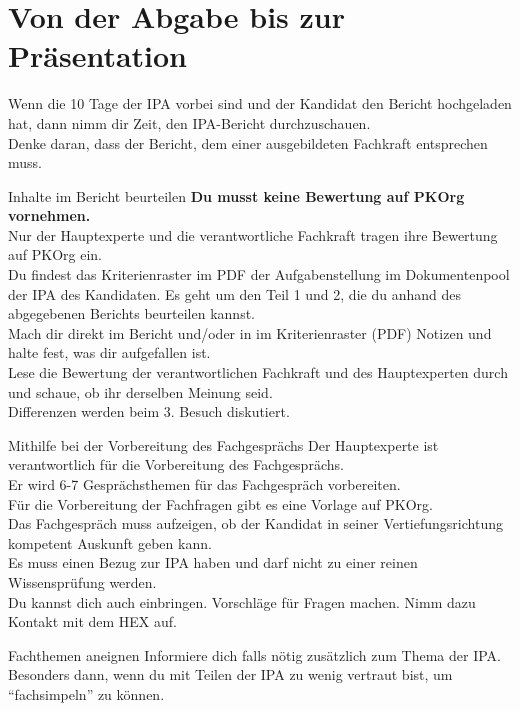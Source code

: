 \section{Von der Abgabe bis zur Präsentation}
Wenn die 10 Tage der IPA vorbei sind und der Kandidat den Bericht hochgeladen hat, dann nimm dir Zeit, den IPA-Bericht durchzuschauen.\\
Denke daran, dass der Bericht, dem einer ausgebildeten Fachkraft entsprechen muss.

\begin{taskitemwithoutcomment}{Inhalte im Bericht beurteilen}
  \textbf{Du musst keine Bewertung auf PKOrg vornehmen.}\\
  Nur der Hauptexperte und die verantwortliche Fachkraft tragen ihre Bewertung auf PKOrg ein.\\
  Du findest das Kriterienraster im PDF der Aufgabenstellung im Dokumentenpool der IPA des Kandidaten.
  Es geht um den Teil 1 und 2, die du anhand des abgegebenen Berichts beurteilen kannst.\\
  Mach dir direkt im Bericht und/oder in im Kriterienraster (PDF) Notizen und halte fest, was dir aufgefallen ist.\\
  Lese die Bewertung der verantwortlichen Fachkraft und des Hauptexperten durch und schaue, ob ihr derselben Meinung seid.\\
  Differenzen werden beim 3. Besuch diskutiert.
\end{taskitemwithoutcomment}
\begin{taskitemwithoutcomment}{Mithilfe bei der Vorbereitung des Fachgesprächs}
  Der Hauptexperte ist verantwortlich für die Vorbereitung des Fachgesprächs.\\
  Er wird 6-7 Gesprächsthemen für das Fachgespräch vorbereiten.\\
  Für die Vorbereitung der Fachfragen gibt es eine Vorlage auf PKOrg.\\
  Das Fachgespräch muss aufzeigen, ob der Kandidat in seiner Vertiefungsrichtung kompetent Auskunft geben kann.\\
  Es muss einen Bezug zur IPA haben und darf nicht zu einer reinen Wissensprüfung werden.\\
  Du kannst dich auch einbringen. Vorschläge für Fragen machen. Nimm dazu Kontakt mit dem HEX auf.
\end{taskitemwithoutcomment}
\begin{taskitemwithoutcomment}{Fachthemen aneignen}
  Informiere dich falls nötig zusätzlich zum Thema der IPA. 
  Besonders dann, wenn du mit Teilen der IPA zu wenig vertraut bist, um \enquote{fachsimpeln} zu können.
\end{taskitemwithoutcomment}
